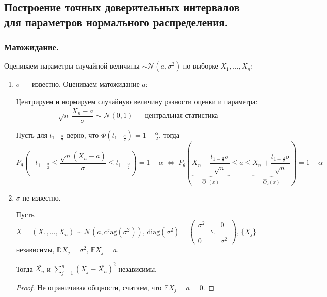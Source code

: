 \subsection{Построение точных доверительных интервалов для параметров нормального распределения.}

\subsubsection{Матожидание.}

Оцениваем параметры случайной величины $\sim \mathcal{N}(a, \sigma^2)$ по выборке $X_1, \dots, X_n$:
\begin{enumerate}
	\item $\sigma$ --- известно. Оцениваем матожидание $a$:
	
	Центрируем и нормируем случайную величину разности оценки и параметра:
	\[ \sqrt{n}\,\frac{\overline{X_n} - a}{\sigma} \sim \mathcal{N}(0, 1) \text{ --- центральная статистика} \]
	
	Пусть для $t_{1-\frac{\alpha}2}$ верно, что $\Phi \left( t_{1 - \frac{\alpha}2} \right) = 1 - \frac{\alpha}2$, тогда 
	\[ P_{\theta} \left( -t_{1 - \frac{\alpha}2} \le \frac{\sqrt{n}(\overline{X_n} - a)}{\sigma} \le t_{1 - \frac{\alpha}2} \right) = 
	1 - \alpha \;\Leftrightarrow\; 
	P_{\theta} \left( \underset{\hat\Theta_1(x)}{\underbrace{\overline{X_n} - \frac{t_{1 - \frac{\alpha}2} \sigma}{\sqrt{n}}}} \le a \le 
	\underset{\hat\Theta_2(x)}{\underbrace{\overline{X_n} + \frac{t_{1 - \frac{\alpha}2} \sigma}{\sqrt{n}}}} \right) = 1 - \alpha \]
	
	\item $\sigma$ не известно.
	
	\begin{lemma*}
		Пусть $X \!=\! (X_1, \dots, X_n) \sim \mathcal{N} \left( a, \text{diag}(\sigma^2) \right), \, \text{diag}(\sigma^2) \!=\! 
		\left(\begin{matrix} \sigma^2 && 0 \\[-5 pt] & \!\!\!\!\!\ddots\!\!\!\!\! & \\[-5 pt] 0 && \sigma^2 \end{matrix}\right)\!\!, \, \{ X_j \}$ независимы, $\mathbb{D} X_j \!=\! \sigma^2\!, \, \mathbb{E} X_j \!=\! a$.
		
		Тогда $\overline{X_n}$ и $\sum_{j=1}^n (X_j - \overline{X_n})^2$ независимы.
	\end{lemma*}
	\begin{proof}
		Не ограничивая общности, считаем, что $\mathbb{E} X_j = a = 0$.
		

\end{proof}
\end{enumerate}
